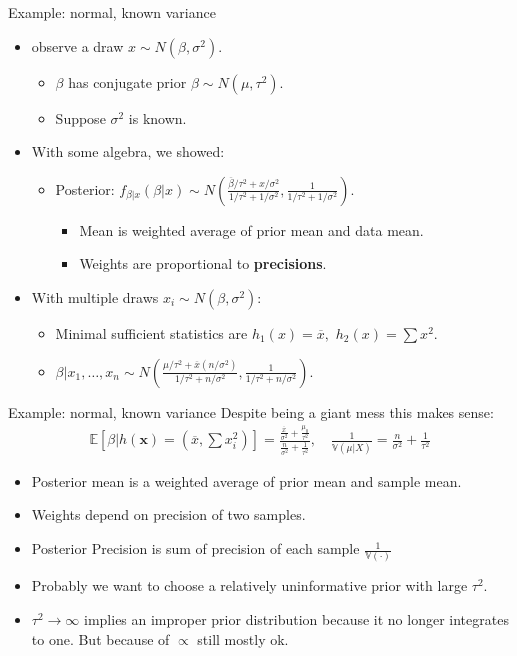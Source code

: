 \documentclass[aspectratio=169]{beamer}
\begin{document}
\begin{frame}{Example: normal, known variance}
\begin{itemize}
\item observe a draw $x\sim N(\beta,\sigma^{2}).$ 
\begin{itemize}
\item $\beta$ has conjugate prior $\beta\sim N(\mu,\tau^2).$
\item Suppose $\sigma^{2}$ is known.
\end{itemize}
\item With some algebra, we showed:
\begin{itemize}
\item Posterior: $f_{\beta|x}(\beta|x)\sim N\left(\frac{\overline{\beta}/\tau^{2}+x/\sigma^{2}}{1/\tau^{2}+1/\sigma^{2}},\frac{1}{1/\tau^{2}+1/\sigma^{2}}\right).$
\begin{itemize}
\item Mean is weighted average of prior mean and data mean.
\item Weights are proportional to \textbf{precisions}. 
\end{itemize}
\end{itemize}
\item With multiple draws $x_{i}\sim N(\beta,\sigma^{2})$:
\begin{itemize}
\item Minimal sufficient statistics are $h_{1}(x)=\overline{x},$ $h_{2}(x)=\sum x^{2}.$
\item $\beta|x_{1},\ldots,x_{n}\sim N\left(\frac{\mu/\tau^{2}+\overline{x}\left(n/\sigma^{2}\right)}{1/\tau^2+n/\sigma^{2}},\frac{1}{1/\tau^2+n/\sigma^{2}}\right).$
\end{itemize}
\end{itemize}
\end{frame}
%

\begin{frame}{Example: normal, known variance}
Despite being a giant mess this makes sense:
\begin{align*}
\mathbb{E}[\beta | h(\mathbf{x}) =(\overline{x},\sum x_i^2)]
=\frac{\frac{\overline{x}}{\sigma^{2}}+\frac{\mu_{0}}{\tau^{2}}}{\frac{n}{\sigma^{2}}+\frac{1}{\tau^{2}}}, \quad \frac{1}{\mathbb{V}(\mu | X)}
=\frac{n}{\sigma^{2}}+\frac{1}{\tau^{2}}
\end{align*}
\begin{itemize}
\item Posterior mean is a weighted average of \alert{prior mean} and \alert{sample mean}.
\item Weights depend on \alert{precision} of two samples.
\item Posterior \alert{Precision} is sum of precision of each sample $\frac{1}{\mathbb{V}(\cdot)}$
\item Probably we want to choose a relatively \alert{uninformative} prior with large $\tau^2$.
\item $\tau^2 \rightarrow \infty$ implies an \alert{improper prior distribution} because it no longer integrates to one. But because of $\propto$ still mostly ok.
\end{itemize}
\end{frame}
\end{document}
